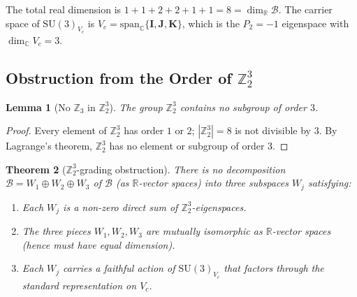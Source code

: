 \documentclass[12pt,a4paper]{article}
\newtheorem{theorem}{Theorem}[section]
\newtheorem{lemma}[theorem]{Lemma}
\theoremstyle{remark}
\begin{document}
The total real dimension is $1+1+2+2+1+1 = 8 = \dim_\mathbb{R}\mathcal{B}$.
The carrier space of $\mathrm{SU}(3)_{V_c}$ is $V_c = \mathrm{span}_\mathbb{C}
\{\mathbf{I},\mathbf{J},\mathbf{K}\}$, which is the $P_2 = -1$ eigenspace
with $\dim_\mathbb{C} V_c = 3$.

\subsection{Obstruction from the Order of $\mathbb{Z}_2^3$}

\begin{lemma}[No $\mathbb{Z}_3$ in $\mathbb{Z}_2^3$]
  \label{lem:no_z3}
  The group $\mathbb{Z}_2^3$ contains no subgroup of order $3$.
\end{lemma}

\begin{proof}
  Every element of $\mathbb{Z}_2^3$ has order $1$ or $2$;
  $|\mathbb{Z}_2^3| = 8$ is not divisible by $3$.  By Lagrange's theorem,
  $\mathbb{Z}_2^3$ has no element or subgroup of order $3$.
\end{proof}

\begin{theorem}[$\mathbb{Z}_2^3$-grading obstruction]
  \label{thm:grading_obstruction}
  There is no decomposition $\mathcal{B} = W_1 \oplus W_2 \oplus W_3$ of
  $\mathcal{B}$ (as $\mathbb{R}$-vector spaces) into three subspaces $W_j$
  satisfying:
  \begin{enumerate}[label=(\alph*)]
    \item Each $W_j$ is a non-zero direct sum of $\mathbb{Z}_2^3$-eigenspaces.
    \item The three pieces $W_1, W_2, W_3$ are mutually isomorphic as
          $\mathbb{R}$-vector spaces (hence must have equal dimension).
    \item Each $W_j$ carries a faithful action of $\mathrm{SU}(3)_{V_c}$
          that factors through the standard representation on $V_c$.
  \end{enumerate}
\end{theorem}
\end{document}
